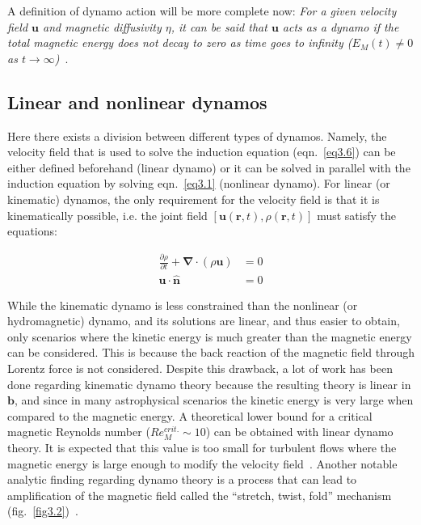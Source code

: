 \documentclass[12pt,a4paper]{report}
\begin{document}
A definition of dynamo action will be more complete now: \textit{For a given velocity field $\bm u$ and magnetic diffusivity $\eta$, it can be said that $\bm u$ acts as a dynamo if the total magnetic energy does not decay to zero as time goes to infinity ($E_M (t) \neq 0$ as $t \rightarrow \infty$)}~\cite{schnack2009lectures}.

\subsection{Linear and nonlinear dynamos}

Here there exists a division between different types of dynamos. Namely, the velocity field that is used to solve the induction equation (eqn.~\ref{eq3.6}) can be either defined beforehand (linear dynamo) or it can be solved in parallel with the induction equation by solving eqn.~\ref{eq3.1} (nonlinear dynamo). For linear (or kinematic) dynamos, the only requirement for the velocity field is that it is kinematically possible, i.e. the joint field  $\left[ \bm u(\bm r, t), \rho(\bm r, t) \right]$ must satisfy the equations:

\begin{align}
 \frac{\partial \rho}{\partial t} + \bm \nabla \cdot (\rho \bm u) &= 0 \nonumber \\
 \bm u \cdot \bm{\hat{n}} &= 0 \nonumber
\end{align}

While the kinematic dynamo is less constrained than the nonlinear (or hydromagnetic) dynamo, and its solutions are linear, and thus easier to obtain, only scenarios where the kinetic energy is much greater than the magnetic energy can be considered. This is because the back reaction of the magnetic field through Lorentz force is not considered. Despite this drawback, a lot of work has been done regarding kinematic dynamo theory because the resulting theory is linear in $\bm b$, and since in many astrophysical scenarios the kinetic energy is very large when compared to the magnetic energy. A theoretical lower bound for a critical magnetic Reynolds number ($Re_M^{crit.} \sim 10$) can be obtained with linear dynamo theory. It is expected that this value is too small for turbulent flows where the magnetic energy is large enough to modify the velocity field~\cite{schnack2009lectures}. Another notable analytic finding regarding dynamo theory is a process that can lead to amplification of the magnetic field called the ``stretch, twist, fold'' mechanism (fig.~\ref{fig3.2})~\cite{vauinshteuin1972origin}. 
\end{document}
